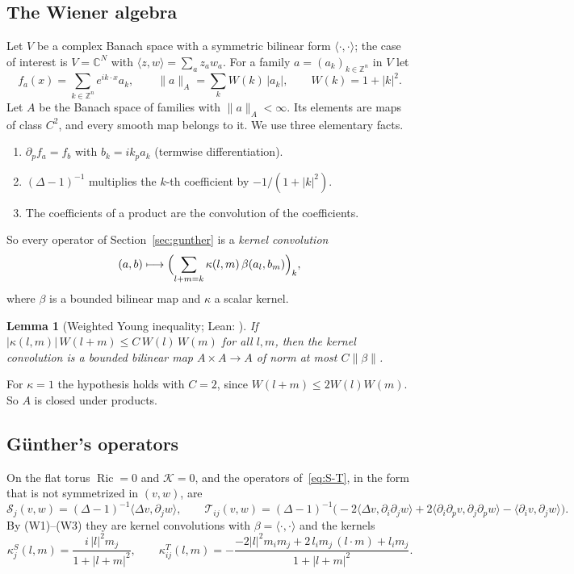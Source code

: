 \documentclass[11pt]{amsart}
\newtheorem{lemma}[theorem]{Lemma}
\theoremstyle{definition}
\newcommand{\Ric}{\operatorname{Ric}}
\newcommand{\inner}[2]{\langle #1, #2\rangle}
\newcommand{\cS}{\mathcal{S}}
\newcommand{\cT}{\mathcal{T}}
\newcommand{\cK}{\mathcal{K}}
\newcommand{\lean}[1]{\texttt{\detokenize{#1}}}
\begin{document}
\subsection{The Wiener algebra}
Let $V$ be a complex Banach space with a symmetric bilinear form $\inner{\cdot}{\cdot}$; the case
of interest is $V=\mathbb C^N$ with $\inner zw=\sum_az_aw_a$. For a family $a=(a_k)_{k\in\mathbb Z^n}$
in $V$ let
\[
f_a(x)=\sum_{k\in\mathbb Z^n}e^{ik\cdot x}a_k,\qquad
\|a\|_A=\sum_k W(k)\,|a_k|,\qquad W(k)=1+|k|^2 .
\]
Let $A$ be the Banach space of families with $\|a\|_A<\infty$. Its elements are maps of class
$C^2$, and every smooth map belongs to it. We use three elementary facts.
\begin{enumerate}[label=(W\arabic*)]
\item $\partial_pf_a=f_b$ with $b_k=ik_pa_k$ (termwise differentiation).
\item $(\Delta-1)^{-1}$ multiplies the $k$-th coefficient by $-1/(1+|k|^2)$.
\item The coefficients of a product are the convolution of the coefficients.
\end{enumerate}
So every operator of Section~\ref{sec:gunther} is a \emph{kernel convolution}
\[
(a,b)\longmapsto\Bigl(\sum_{l+m=k}\kappa(l,m)\,\beta(a_l,b_m)\Bigr)_k ,
\]
where $\beta$ is a bounded bilinear map and $\kappa$ a scalar kernel.

\begin{lemma}[Weighted Young inequality; Lean: \lean{Torus.wconv}]\label{lem:young}
If $|\kappa(l,m)|\,W(l+m)\le C\,W(l)\,W(m)$ for all $l,m$, then the kernel convolution is a bounded
bilinear map $A\times A\to A$ of norm at most $C\|\beta\|$.
\end{lemma}

For $\kappa=1$ the hypothesis holds with $C=2$, since $W(l+m)\le2W(l)W(m)$. So $A$ is closed under
products.

\subsection{G\"unther's operators}
On the flat torus $\Ric=0$ and $\cK=0$, and the operators of~\eqref{eq:S-T}, in the form that is
not symmetrized in $(v,w)$, are
\[
\cS_j(v,w)=(\Delta-1)^{-1}\inner{\Delta v}{\partial_jw},\qquad
\cT_{ij}(v,w)=(\Delta-1)^{-1}\bigl(-2\inner{\Delta v}{\partial_i\partial_jw}
+2\inner{\partial_i\partial_pv}{\partial_j\partial_pw}-\inner{\partial_iv}{\partial_jw}\bigr).
\]
By (W1)--(W3) they are kernel convolutions with $\beta=\inner{\cdot}{\cdot}$ and the kernels
\[
\kappa^S_j(l,m)=\frac{i\,|l|^2m_j}{1+|l+m|^2},\qquad
\kappa^T_{ij}(l,m)=-\frac{-2|l|^2m_im_j+2\,l_im_j\,(l\cdot m)+l_im_j}{1+|l+m|^2}.
\]
\end{document}
